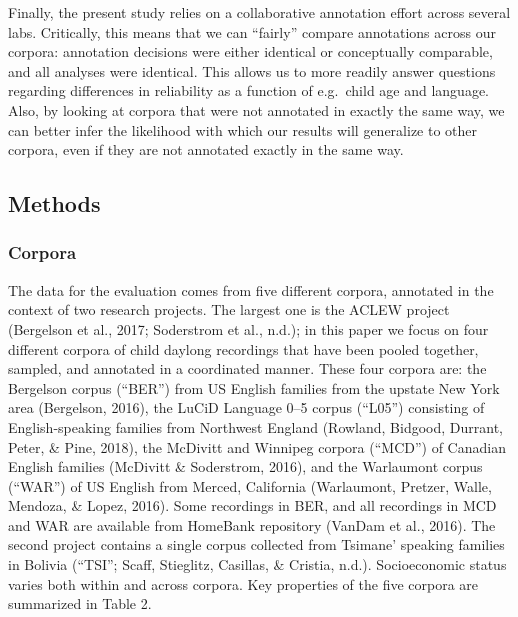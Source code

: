\documentclass[english,table,man,floatsintext]{apa6}
\begin{document}
Finally, the present study relies on a collaborative annotation effort across several labs. Critically, this means that we can \enquote{fairly} compare annotations across our corpora: annotation decisions were either identical or conceptually comparable, and all analyses were identical. This allows us to more readily answer questions regarding differences in reliability as a function of e.g.~child age and language. Also, by looking at corpora that were not annotated in exactly the same way, we can better infer the likelihood with which our results will generalize to other corpora, even if they are not annotated exactly in the same way.

\hypertarget{methods}{%
\subsection{Methods}\label{methods}}

\hypertarget{corpora}{%
\subsubsection{Corpora}\label{corpora}}

The data for the evaluation comes from five different corpora, annotated in the context of two research projects. The largest one is the ACLEW project (Bergelson et al., 2017; Soderstrom et al., n.d.); in this paper we focus on four different corpora of child daylong recordings that have been pooled together, sampled, and annotated in a coordinated manner. These four corpora are: the Bergelson corpus (\enquote{BER}) from US English families from the upstate New York area (Bergelson, 2016), the LuCiD Language 0--5 corpus (\enquote{L05}) consisting of English-speaking families from Northwest England (Rowland, Bidgood, Durrant, Peter, \& Pine, 2018), the McDivitt and Winnipeg corpora (\enquote{MCD}) of Canadian English families (McDivitt \& Soderstrom, 2016), and the Warlaumont corpus (\enquote{WAR}) of US English from Merced, California (Warlaumont, Pretzer, Walle, Mendoza, \& Lopez, 2016). Some recordings in BER, and all recordings in MCD and WAR are available from HomeBank repository (VanDam et al., 2016). The second project contains a single corpus collected from Tsimane' speaking families in Bolivia (``TSI''; Scaff, Stieglitz, Casillas, \& Cristia, n.d.). Socioeconomic status varies both within and across corpora. Key properties of the five corpora are summarized in Table 2.
\end{document}

